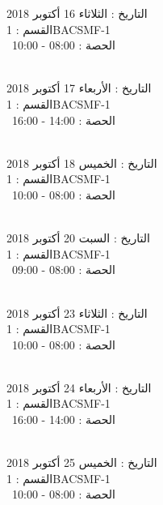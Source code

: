 التاريخ : الثلاثاء 16 أكتوبر 2018 \\
القسم : 1BACSMF-1 \\
 \  
الحصة : 08:00 - 10:00 \\
\par
\noindent\makebox[\linewidth]{\rule{\paperwidth}{0.4pt}}
 \\
التاريخ : الأربعاء 17 أكتوبر 2018 \\
القسم : 1BACSMF-1 \\
 \  
الحصة : 14:00 - 16:00 \\
\par
\noindent\makebox[\linewidth]{\rule{\paperwidth}{0.4pt}}
 \\
التاريخ : الخميس 18 أكتوبر 2018 \\
القسم : 1BACSMF-1 \\
 \  
الحصة : 08:00 - 10:00 \\
\par
\noindent\makebox[\linewidth]{\rule{\paperwidth}{0.4pt}}
 \\
التاريخ : السبت 20 أكتوبر 2018 \\
القسم : 1BACSMF-1 \\
 \  
الحصة : 08:00 - 09:00 \\
\par
\noindent\makebox[\linewidth]{\rule{\paperwidth}{0.4pt}}
 \\
التاريخ : الثلاثاء 23 أكتوبر 2018 \\
القسم : 1BACSMF-1 \\
 \  
الحصة : 08:00 - 10:00 \\
\par
\noindent\makebox[\linewidth]{\rule{\paperwidth}{0.4pt}}
 \\
التاريخ : الأربعاء 24 أكتوبر 2018 \\
القسم : 1BACSMF-1 \\
 \  
الحصة : 14:00 - 16:00 \\
\par
\noindent\makebox[\linewidth]{\rule{\paperwidth}{0.4pt}}
 \\
التاريخ : الخميس 25 أكتوبر 2018 \\
القسم : 1BACSMF-1 \\
 \  
الحصة : 08:00 - 10:00 \\
